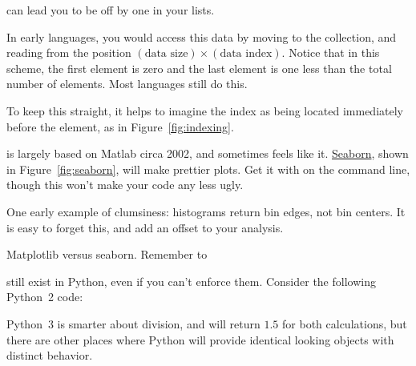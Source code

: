 \documentclass[justified, nobib]{tufte-handout}
\begin{document}
 can lead you to be off by one in your lists.


\begin{marginfigure}
    \def\svgwidth{140pt}{}
    \caption{%
    How to count in Python.
    Shaded elements correspond to those selected by indices [1:3]}
\label{fig:indexing}
\end{marginfigure}

\noindent
In early languages, you would access this data by moving to the collection, and reading from the position $(\text{data size}) \times (\text{data index})$.
Notice that in this scheme, the first element is zero and the last element is one less than the total number of elements.
Most languages still do this.



\noindent
To keep this straight, it helps to imagine the index as being located immediately before the element, as in Figure~\ref{fig:indexing}.

\smallskip

 is largely based on Matlab circa 2002, and sometimes feels like it. \href{https://stanford.edu/~mwaskom/software/seaborn/index.html}{Seaborn}, shown in Figure~\ref{fig:seaborn}, will make prettier plots.
Get it with  on the command line, though this won't make your code any less ugly.

\noindent
One early example of clumsiness: histograms return bin edges, not bin centers.
It is easy to forget this, and add an offset to your analysis.

\begin{marginfigure}
    \vspace*{\fill}
    \centering

    \def\svgwidth{140pt}

    \vspace*{\fill}
    \bigskip
    \def\svgwidth{140pt}
  \caption{Matplotlib versus seaborn.
  \hspace{\textwidth}Remember to }
\label{fig:seaborn}
\end{marginfigure}



\vspace{5mm}
 still exist in Python, even if you can't enforce them.
Consider the following Python~2 code:

Python~3 is smarter about division, and will return $1.5$ for both calculations, but there are other places where Python will provide identical looking objects with distinct behavior.
\end{document}
